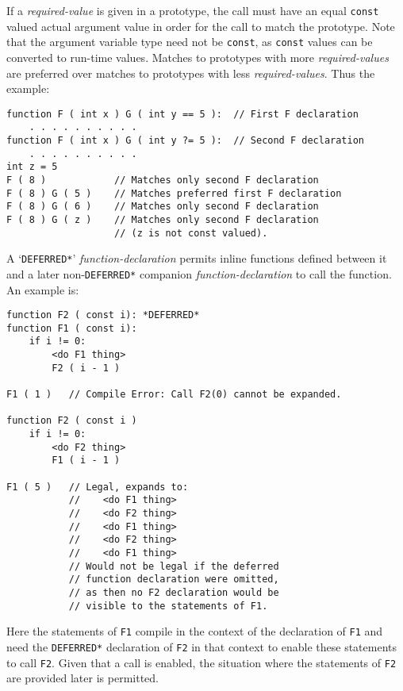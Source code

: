 \documentclass[12pt]{article}
\newenvironment{indpar}[1][0.3in]%
	{\begin{list}{}%
		     {\setlength{\itemsep}{0in}%
		      \setlength{\topsep}{0in}%
		      \setlength{\parsep}{1ex}%
		      \setlength{\labelwidth}{#1}%
		      \setlength{\leftmargin}{#1}%
		      \addtolength{\leftmargin}{\labelsep}}%
	 \item}%
	{\end{list}}
\begin{document}
If a {\em required-value} is given in a prototype, the call must
have an equal {\tt const} valued actual argument value
in order for the call to match the prototype.
Note that the argument variable type need not be {\tt const},
as {\tt const} values can be converted to run-time values.
Matches to prototypes with more {\em required-values}
are preferred over matches to prototypes with less {\em required-values}.
Thus the example:
\begin{indpar}\begin{verbatim}
function F ( int x ) G ( int y == 5 ):  // First F declaration
    . . . . . . . . . .
function F ( int x ) G ( int y ?= 5 ):  // Second F declaration
    . . . . . . . . . .
int z = 5
F ( 8 )            // Matches only second F declaration
F ( 8 ) G ( 5 )    // Matches preferred first F declaration
F ( 8 ) G ( 6 )    // Matches only second F declaration
F ( 8 ) G ( z )    // Matches only second F declaration
                   // (z is not const valued).
\end{verbatim}\end{indpar}

A `{\tt *DEFERRED*}' {\em function-declaration} permits
inline functions defined between it and a later
non-{\tt *DEFERRED*} companion {\em function-declaration} to call the
function.  An example is:
\begin{indpar}\begin{verbatim}
function F2 ( const i): *DEFERRED*
function F1 ( const i):
    if i != 0:
        <do F1 thing>
        F2 ( i - 1 )

F1 ( 1 )   // Compile Error: Call F2(0) cannot be expanded.

function F2 ( const i )
    if i != 0:
        <do F2 thing>
        F1 ( i - 1 )

F1 ( 5 )   // Legal, expands to:
           //    <do F1 thing>
           //    <do F2 thing>
           //    <do F1 thing>
           //    <do F2 thing>
           //    <do F1 thing>
           // Would not be legal if the deferred
           // function declaration were omitted,
           // as then no F2 declaration would be
           // visible to the statements of F1.
\end{verbatim}\end{indpar}
Here the statements of {\tt F1} compile in the context
of the declaration of {\tt F1} and need the {\tt *DEFERRED*}
declaration of {\tt F2} in that context to enable these
statements to call {\tt F2}.  Given that a call is enabled,
the situation where the statements of {\tt F2} are provided later
is permitted.
\end{document}
